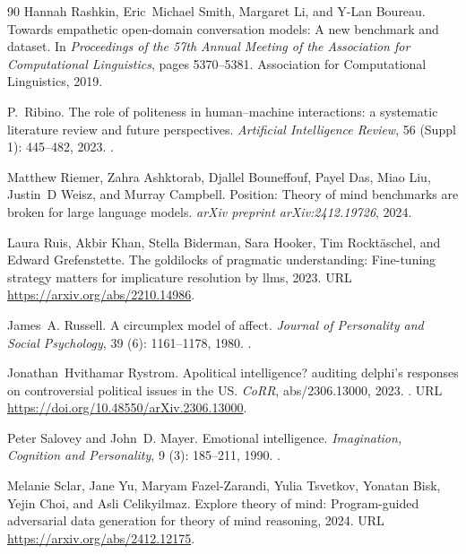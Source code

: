 \begin{thebibliography}{90}
Hannah Rashkin, Eric~Michael Smith, Margaret Li, and Y-Lan Boureau.
\newblock Towards empathetic open-domain conversation models: A new benchmark and dataset.
\newblock In \emph{Proceedings of the 57th Annual Meeting of the Association for Computational Linguistics}, pages 5370--5381. Association for Computational Linguistics, 2019.

P.~Ribino.
\newblock The role of politeness in human--machine interactions: a systematic literature review and future perspectives.
\newblock \emph{Artificial Intelligence Review}, 56 (Suppl 1): 445--482, 2023.
\newblock {}.

Matthew Riemer, Zahra Ashktorab, Djallel Bouneffouf, Payel Das, Miao Liu, Justin~D Weisz, and Murray Campbell.
\newblock Position: Theory of mind benchmarks are broken for large language models.
\newblock \emph{arXiv preprint arXiv:2412.19726}, 2024.

Laura Ruis, Akbir Khan, Stella Biderman, Sara Hooker, Tim Rocktäschel, and Edward Grefenstette.
\newblock The goldilocks of pragmatic understanding: Fine-tuning strategy matters for implicature resolution by llms, 2023.
\newblock URL \url{https://arxiv.org/abs/2210.14986}.

James~A. Russell.
\newblock A circumplex model of affect.
\newblock \emph{Journal of Personality and Social Psychology}, 39 (6): 1161--1178, 1980.
\newblock {}.

Jonathan~Hvithamar Rystrom.
\newblock Apolitical intelligence? auditing delphi's responses on controversial political issues in the {US}.
\newblock \emph{CoRR}, abs/2306.13000, 2023.
\newblock {}.
\newblock URL \url{https://doi.org/10.48550/arXiv.2306.13000}.

Peter Salovey and John~D. Mayer.
\newblock Emotional intelligence.
\newblock \emph{Imagination, Cognition and Personality}, 9 (3): 185--211, 1990.
\newblock {}.

Melanie Sclar, Jane Yu, Maryam Fazel-Zarandi, Yulia Tsvetkov, Yonatan Bisk, Yejin Choi, and Asli Celikyilmaz.
\newblock Explore theory of mind: Program-guided adversarial data generation for theory of mind reasoning, 2024.
\newblock URL \url{https://arxiv.org/abs/2412.12175}.


\end{thebibliography}
